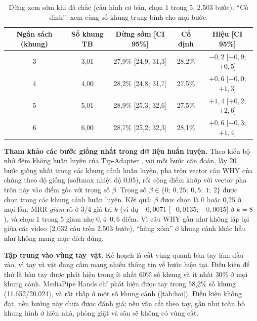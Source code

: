 \documentclass[a4paper,oneside]{report}
\begin{document}
\begin{table}[ht]
\centering
\caption{Dừng xem sớm khi đã chắc (cấu hình cơ bản, chọn 1 trong 5, 2.503 bước). ``Cố định'': xem cùng số khung trung bình cho mọi bước.}
\label{tab:ead}
\small
\begin{tabular}{ccccc}
\toprule
Ngân sách (khung) & Số khung TB & Dừng sớm [CI 95\%] & Cố định & Hiệu [CI 95\%] \\
\midrule
3 & 3,01 & 27,9\% [24,9; 31,3] & 28,2\% & $-0{,}2$ [$-0{,}9$; $+0{,}5$] \\
4 & 4,00 & 28,2\% [24,8; 31,7] & 27,5\% & $+0{,}6$ [$-0{,}0$; $+1{,}3$] \\
5 & 5,01 & 28,9\% [25,3; 32,6] & 27,5\% & $+1{,}4$ [$+0{,}2$; $+2{,}6$] \\
6 & 6,00 & 28,7\% [25,2; 32,3] & 28,1\% & $+0{,}6$ [$-0{,}3$; $+1{,}4$] \\
\bottomrule
\end{tabular}
\end{table}

\textbf{Tham khảo các bước giống nhất trong dữ liệu huấn luyện.} Theo kiểu bộ nhớ đệm không huấn luyện của Tip-Adapter \citep{zhang2022tip}, với mỗi bước cần đoán, lấy 20 bước giống nhất trong các khung cảnh huấn luyện, pha trộn vector câu WHY của chúng theo độ giống (softmax nhiệt độ 0,05), rồi cộng điểm khớp với vector pha trộn này vào điểm gốc với trọng số $\beta$. Trọng số $\beta\in\{0;\ 0{,}25;\ 0{,}5;\ 1;\ 2\}$ được chọn trong các khung cảnh huấn luyện. Kết quả: $\beta$ được chọn là 0 hoặc 0,25 ở mọi lần; MRR \textit{giảm} rõ ở 3/4 giá trị $k$ (ví dụ $-0{,}0071$ [$-0{,}0135$; $-0{,}0015$] ở $k=8$), và chọn 1 trong 5 giảm nhẹ $0{,}4$--$0{,}6$ điểm. Vì câu WHY gần như không lặp lại giữa các video (2.032 câu trên 2.503 bước), ``hàng xóm'' ở khung cảnh khác hầu như không mang mục đích đúng.

\textbf{Tập trung vào vùng tay--vật.} Kế hoạch là cắt vùng quanh bàn tay làm đầu vào, vì tay và vật đang cầm mang nhiều thông tin về bước hiện tại. Điều kiện để thử là bàn tay được phát hiện trong ít nhất 60\% số khung và ít nhất 30\% ở mọi khung cảnh. MediaPipe Hands \citep{zhang2020mediapipe} chỉ phát hiện được tay trong 58,2\% số khung (11.652/20.024), và rất thấp ở một số khung cảnh (\cref{tab:hoi}). Điều kiện không đạt, nên hướng này chưa được đánh giá; nếu vẫn cắt theo tay, gần như toàn bộ khung hình ở hiên nhà, phòng giặt và sân sẽ không có vùng cắt.
\end{document}
